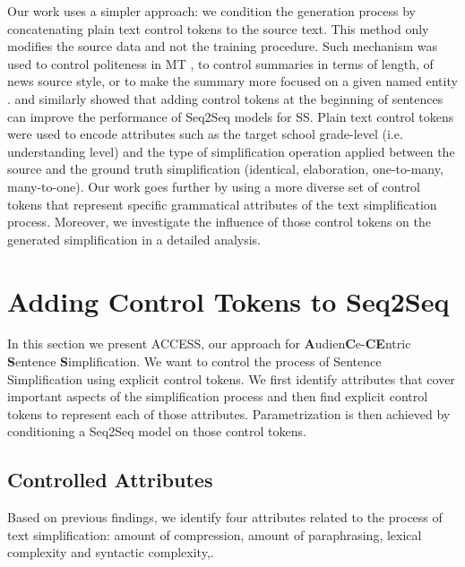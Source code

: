 \documentclass[10pt, a4paper]{article}
\begin{document}
Our work uses a simpler approach: we condition the generation process by concatenating plain text control tokens to the source text. This method only modifies the source data and not the training procedure.
Such mechanism was used to control politeness in MT \cite{sennrich2016controlling}, to control summaries in terms of length, of news source style, or to make the summary more focused on a given named entity \cite{fan2017controllable}.
 and  similarly showed that adding control tokens at the beginning of sentences can improve the performance of Seq2Seq models for SS. Plain text control tokens were used to encode attributes such as the target school grade-level (i.e. understanding level) and the type of simplification operation applied between the source and the ground truth simplification (identical, elaboration, one-to-many, many-to-one).
Our work goes further by using a more diverse set of control tokens that represent specific grammatical attributes of the text simplification process.
Moreover, we investigate the influence of those control tokens on the generated simplification in a detailed analysis.


\section{Adding Control Tokens to Seq2Seq} \label{method_section}
In this section we present \textsc{ACCESS}, our approach for \textbf{A}udien\textbf{C}e-\textbf{CE}ntric \textbf{S}entence \textbf{S}implification.
We want to control the process of Sentence Simplification using explicit control tokens.
We first identify attributes that cover important aspects of the simplification process and then find explicit control tokens to represent each of those attributes.
Parametrization is then achieved by conditioning a Seq2Seq model on those control tokens.

\subsection{Controlled Attributes}
Based on previous findings, we identify four attributes related to the process of text simplification:  amount of compression, amount of paraphrasing, lexical complexity and syntactic complexity,.
\end{document}
